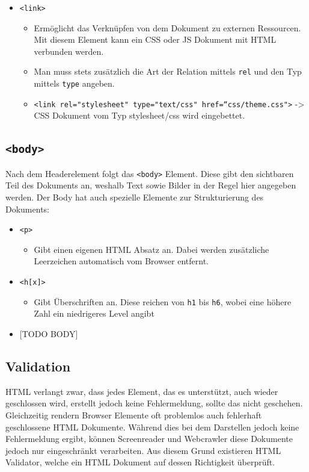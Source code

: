 \documentclass{article}
\begin{document}
\begin{itemize}
\begin{itemize}
		\end{itemize}
		\item{\texttt{<link>}}
		\begin{itemize}
			\item{Ermöglicht das Verknüpfen von dem Dokument zu externen Ressourcen. Mit diesem Element kann ein CSS oder JS Dokument mit HTML verbunden werden.}
			\item{Man muss stets zusätzlich die Art der Relation mittels \texttt{rel} und den Typ mittels \texttt{type} angeben.}
			\item{\texttt{<link rel="stylesheet" type="text/css" href=“css/theme.css">} -> CSS Dokument vom Typ stylesheet/css wird eingebettet.}
		\end{itemize}
	\end{itemize}
	\subsection{\texttt{<body>}}
	Nach dem Headerelement folgt das \texttt{<body>} Element. Diese gibt den sichtbaren Teil des Dokuments an, weshalb Text sowie Bilder in der Regel hier angegeben werden. Der Body hat auch spezielle Elemente zur Strukturierung des Dokuments:
	\begin{itemize}
		\item{\texttt{<p>}}
		\begin{itemize}
			\item{Gibt einen eigenen HTML Absatz an. Dabei werden zusätzliche Leerzeichen automatisch vom Browser entfernt.}
		\end{itemize}
		\item{\texttt{<h[x]>}}
		\begin{itemize}
			\item{Gibt Überschriften an. Diese reichen von \texttt{h1} bis \texttt{h6}, wobei eine höhere Zahl ein niedrigeres Level angibt}
		\end{itemize}
		\item{[TODO BODY]}
	\end{itemize}
	\subsection{Validation}
	HTML verlangt zwar, dass jedes Element, das es unterstützt, auch wieder geschlossen wird, erstellt jedoch keine Fehlermeldung, sollte das nicht geschehen. Gleichzeitig rendern Browser Elemente oft problemlos auch fehlerhaft geschlossene HTML Dokumente. Während dies bei dem Darstellen jedoch keine Fehlermeldung ergibt, können Screenreader und Webcrawler diese Dokumente jedoch nur eingeschränkt verarbeiten. Aus diesem Grund existieren HTML Validator, welche ein HTML Dokument auf dessen Richtigkeit überprüft.
\end{document}
